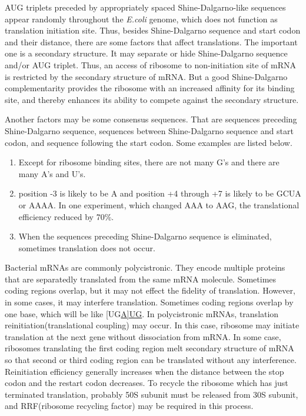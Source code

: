 AUG triplets preceded by appropriately spaced Shine-Dalgarno-like
sequences appear randomly throughout the {\it E.coli} genome, which
does not function as translation initiation site.  Thus, besides
Shine-Dalgarno sequence and start codon and their distance, there are
some factors that affect translations. The important one is a
secondary structure. It may separate or hide Shine-Dalgarno sequence
and/or AUG triplet.  Thus, an access of ribosome to non-initiation
site of mRNA is restricted by the secondary structure of mRNA. But a
good Shine-Dalgarno complementarity provides the ribosome with an
increased affinity for its binding site, and thereby enhances its
ability to compete against the secondary structure\cite{label26}.

Another factors may be some consensus sequences. That are sequences 
preceding Shine-Dalgarno sequence,
sequences between Shine-Dalgarno sequence and start codon, and sequence
following the start codon. Some examples are listed below.

\begin{enumerate}
\item Except for ribosome binding sites, there are not many  G's and there are
many A's and U's.
\item position -3 is likely to be A and position +4 through +7 is
likely to be GCUA or AAAA. In one experiment, which changed AAA to AAG,
the translational efficiency reduced by 70\%\cite{label25}.
\item When the sequences preceding Shine-Dalgarno sequence is eliminated,
sometimes translation does not occur.

\end{enumerate}

Bacterial mRNAs are commonly polycistronic. They encode multiple
proteins that are separatedly translated from the same mRNA
molecule. Sometimes coding regions overlap, but it may not effect the
fidelity of translation. However, in some cases, it may interfere
translation\cite{label1307}. Sometimes coding regions overlap by one
base, which will be like [UG\underline{A]UG}. In polycistronic mRNAs,
translation reinitiation(translational coupling) may
occur\cite{label891,label1205}. In this case, ribosome may initiate
translation at the next gene without dissociation from
mRNA\cite{label4001}. In some case, ribosomes translating the first
coding region melt secondary structure of mRNA so that second or third
coding region can be translated without any interference. Reinitiation
efficiency generally increases when the distance between the stop codon
and the restart codon decreases\cite{label4003}. To recycle the ribosome
which has just terminated translation, probably 50S subunit must be
released from 30S subunit, and RRF(ribosome recycling factor) may be
required in this process\cite{label1189}.

